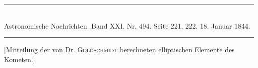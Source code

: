 \bigskip
\hypertarget{native-469-notice1844}{}
\begin{center}
\rule{0.55\linewidth}{0.4pt}\\[2pt]
Astronomische Nachrichten. Band XXI. Nr. 494. Seite 221. 222. 18. Januar 1844.\\[2pt]
\rule{0.55\linewidth}{0.4pt}
\end{center}

[Mitteilung der von Dr. \textsc{Goldschmidt} berechneten elliptischen Elemente des Kometen.]

